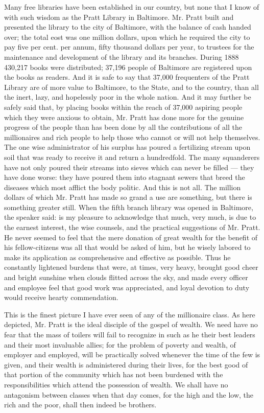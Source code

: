 \documentclass[11pt,openany]{book}
\begin{document}
Many free libraries have been established in our country, but none that I know of with such wisdom as the Pratt Library in Baltimore. Mr. Pratt built and presented the library to the city of Baltimore, with the balance of cash handed over; the total eost was one million dollars, upon which he required the city to pay five per cent. per annum, fifty thousand dollars per year, to trustees for the maintenance and development of the library and its branches. During 1888 430,217 books were distributed; 37,196 people of Baltimore are registered upon the books as readers. And it is safe to say that 37,000 frequenters of the Pratt Library are of more value to Baltimore, to the State, and to the country, than all the inert, lazy, and hopelessly poor in the whole nation. And it may further be safely said that, by placing books within the reach of 37,000 aspiring people which they were anxious to obtain, Mr. Pratt has done more for the genuine progress of the people than has been done by all the contributions of all the millionaires and rich people to help those who cannot or will not help themselves. The one wise administrator of his surplus has poured a fertilizing stream upon soil that was ready to receive it and return a hundredfold. The many squanderers have not only poured their streams into sieves which can never be filled --- they have done worse: they have poured them into stagnant sewers that breed the diseases which most afflict the body politic. And this is not all. The million dollars of which Mr. Pratt has made so grand a use are something, but there is something greater still. When the fifth branch library was opened in Baltimore, the speaker said: is my pleasure to acknowledge that much, very much, is due to the earnest interest, the wise counsels, and the practical suggestions of Mr. Pratt. He never seemed to feel that the mere donation of great wealth for the benefit of his fellow-citizens was all that would be asked of him, but he wisely labored to make its application as comprehensive and effective as possible. Thus he constantly lightened burdens that were, at times, very heavy, brought good cheer and bright sunshine when clouds flitted across the sky, and made every officer and employee feel that good work was appreciated, and loyal devotion to duty would receive hearty commendation.

This is the finest picture I have ever seen of any of the millionaire class. As here depicted, Mr. Pratt is the ideal disciple of the gospel of wealth. We need have no fear that the mass of toilers will fail to recognize in such as he their best leaders and their most invaluable allies; for the problem of poverty and wealth, of employer and employed, will be practically solved whenever the time of the few is given, and their wealth is administered during their lives, for the best good of that portion of the community which has not been burdened with the responsibilities which attend the possession of wealth. We shall have no antagonism between classes when that day comes, for the high and the low, the rich and the poor, shall then indeed be brothers.
\end{document}
